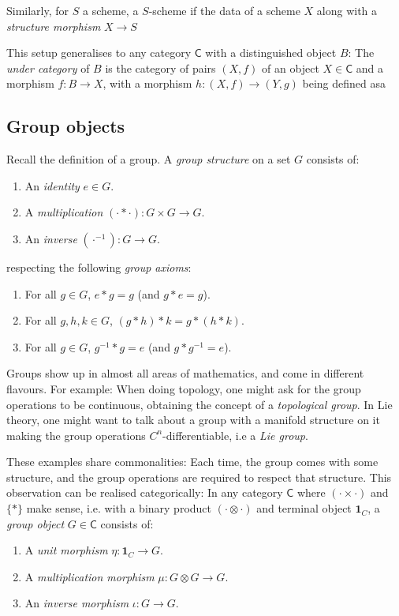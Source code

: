 \documentclass{article}
\begin{document}
Similarly, for $S$ a scheme, a $S$-scheme if the data of a scheme $X$ along with a
\emph{structure morphism} $X \to S$

This setup generalises to any category $\mathsf C$ with a distinguished object $B$:
The \emph{under category} of $B$ is the category of pairs $(X, f)$ of an object $X \in \mathsf C$
and a morphism $f : B \to X$, with a morphism $h : (X, f) \to (Y, g)$ being defined asa



\subsection{Group objects}


Recall the definition of a group. A \emph{group structure} on a set $G$ consists of:
\begin{enumerate}
  \item An \emph{identity} $e \in G$.
  \item A \emph{multiplication} $(\cdot * \cdot) : G \times G \to G$.
  \item An \emph{inverse} $(\cdot^{-1}) : G \to G$.
\end{enumerate}

respecting the following \emph{group axioms}:
\begin{enumerate}
  \item For all $g \in G$, $e * g = g$ (and $g * e = g$).
  \item For all $g, h, k \in G$, $(g * h) * k = g * (h * k)$.
  \item For all $g \in G$, $g^{-1} * g = e$ (and $g * g^{-1} = e$).
\end{enumerate}

Groups show up in almost all areas of mathematics, and come in different flavours. For example:
When doing topology, one might ask for the group operations to be continuous,
obtaining the concept of a \emph{topological group}.
In Lie theory, one might want to talk about a group with a manifold structure on it
making the group operations $C^n$-differentiable, i.e a \emph{Lie group}.

These examples share commonalities: Each time, the group comes with some structure,
and the group operations are required to respect that structure.
This observation can be realised categorically:
In any category $\mathsf C$ where $(\cdot \times \cdot)$ and $\{*\}$ make sense,
i.e. with a binary product $(\cdot \otimes \cdot)$ and terminal object $\mathbf 1_C$,
a \emph{group object} $G \in \mathsf C$ consists of:
\begin{enumerate}
  \item A \emph{unit morphism} $\eta : \mathbf 1_C \to G$.
  \item A \emph{multiplication morphism} $\mu : G \otimes G \to G$.
  \item An \emph{inverse morphism} $\iota : G \to G$.
\end{enumerate}
\end{document}
